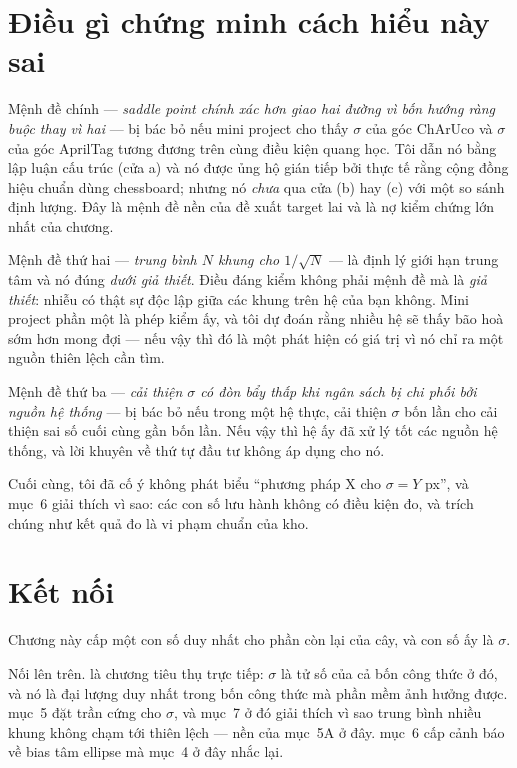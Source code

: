 \documentclass[../../marker.tex]{subfiles}
\begin{document}
\section{Điều gì chứng minh cách hiểu này sai}

Mệnh đề chính --- \emph{saddle point chính xác hơn giao hai đường vì bốn hướng ràng buộc thay vì hai} --- bị bác bỏ nếu mini project cho thấy \(\sigma\) của góc ChArUco và \(\sigma\) của góc AprilTag tương đương trên cùng điều kiện quang học. Tôi dẫn nó bằng lập luận cấu trúc (cửa a) và nó được ủng hộ gián tiếp bởi thực tế rằng cộng đồng hiệu chuẩn dùng chessboard; nhưng nó \emph{chưa} qua cửa (b) hay (c) với một so sánh định lượng. Đây là mệnh đề nền của đề xuất target lai và là nợ kiểm chứng lớn nhất của chương.

Mệnh đề thứ hai --- \emph{trung bình \(N\) khung cho \(1/\sqrt{N}\)} --- là định lý giới hạn trung tâm và nó đúng \emph{dưới giả thiết}. Điều đáng kiểm không phải mệnh đề mà là \emph{giả thiết}: nhiễu có thật sự độc lập giữa các khung trên hệ của bạn không. Mini project phần một là phép kiểm ấy, và tôi dự đoán rằng nhiều hệ sẽ thấy bão hoà sớm hơn mong đợi --- nếu vậy thì đó là một phát hiện có giá trị vì nó chỉ ra một nguồn thiên lệch cần tìm.

Mệnh đề thứ ba --- \emph{cải thiện \(\sigma\) có đòn bẩy thấp khi ngân sách bị chi phối bởi nguồn hệ thống} --- bị bác bỏ nếu trong một hệ thực, cải thiện \(\sigma\) bốn lần cho cải thiện sai số cuối cùng gần bốn lần. Nếu vậy thì hệ ấy đã xử lý tốt các nguồn hệ thống, và lời khuyên về thứ tự đầu tư không áp dụng cho nó.

Cuối cùng, tôi đã cố ý không phát biểu ``phương pháp X cho \(\sigma = Y\) px'', và mục~6 giải thích vì sao: các con số lưu hành không có điều kiện đo, và trích chúng như kết quả đo là vi phạm chuẩn của kho.

\section{Kết nối}

Chương này cấp một con số duy nhất cho phần còn lại của cây, và con số ấy là \(\sigma\).

Nối lên trên.  là chương tiêu thụ trực tiếp: \(\sigma\) là tử số của cả bốn công thức ở đó, và nó là đại lượng duy nhất trong bốn công thức mà phần mềm ảnh hưởng được.  mục~5 đặt trần cứng cho \(\sigma\), và mục~7 ở đó giải thích vì sao trung bình nhiều khung không chạm tới thiên lệch --- nền của mục~5A ở đây.  mục~6 cấp cảnh báo về bias tâm ellipse mà mục~4 ở đây nhắc lại.
\end{document}
